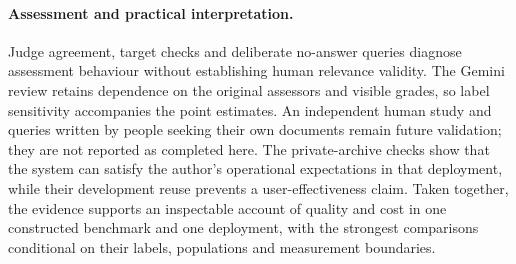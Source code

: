 \paragraph{Assessment and practical interpretation.}
Judge agreement, target checks and deliberate no-answer queries diagnose assessment behaviour without establishing human relevance validity. The Gemini review retains dependence on the original assessors and visible grades, so label sensitivity accompanies the point estimates. An independent human study and queries written by people seeking their own documents remain future validation; they are not reported as completed here. The private-archive checks show that the system can satisfy the author's operational expectations in that deployment, while their development reuse prevents a user-effectiveness claim. Taken together, the evidence supports an inspectable account of quality and cost in one constructed benchmark and one deployment, with the strongest comparisons conditional on their labels, populations and measurement boundaries.
